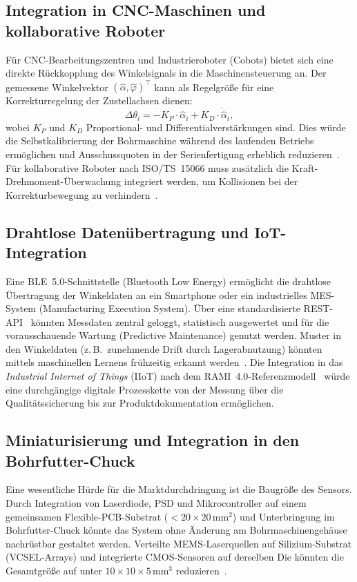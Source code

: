 ﻿\documentclass[a4paper,12pt]{article}
\theoremstyle{definition}
\begin{document}
\subsection{Integration in CNC-Maschinen und kollaborative Roboter}

Für CNC-Bearbeitungszentren und Industrieroboter (Cobots) bietet sich eine
direkte Rückkopplung des Winkelsignals in die Maschinensteuerung an.
Der gemessene Winkelvektor $(\hat{\alpha}, \hat{\varphi})^\top$ kann als
Regelgröße für eine Korrekturregelung der Zustellachsen dienen:
\[
  \Delta\theta_i = -K_P \cdot \hat{\alpha}_i + K_D \cdot \dot{\hat{\alpha}}_i,
\]
wobei $K_P$ und $K_D$ Proportional- und Differentialverstärkungen sind.
Dies würde die Selbstkalibrierung der Bohrmaschine während des laufenden
Betriebs ermöglichen und Ausschussquoten in der Serienfertigung erheblich
reduzieren~\cite{ramesh2000error}.
Für kollaborative Roboter nach ISO/TS~15066 muss zusätzlich die
Kraft-Drehmoment-Überwachung integriert werden, um Kollisionen bei der
Korrekturbewegung zu verhindern~\cite{iso15066}.

\subsection{Drahtlose Datenübertragung und IoT-Integration}

Eine BLE~5.0-Schnittstelle (Bluetooth Low Energy) ermöglicht die drahtlose
Übertragung der Winkeldaten an ein Smartphone oder ein industrielles
MES-System (Manufacturing Execution System).
Über eine standardisierte REST-API~\cite{fielding2000architectural} könnten
Messdaten zentral geloggt, statistisch ausgewertet und für die vorausschauende
Wartung (Predictive Maintenance) genutzt werden.
Muster in den Winkeldaten (z.\,B.\ zunehmende Drift durch Lagerabnutzung)
könnten mittels maschinellen Lernens frühzeitig erkannt werden~\cite{mobley2002maintenance}.
Die Integration in das \textit{Industrial Internet of Things} (IIoT) nach dem
RAMI~4.0-Referenzmodell~\cite{rami2015} würde eine durchgängige digitale
Prozesskette von der Messung über die Qualitätssicherung bis zur
Produktdokumentation ermöglichen.

\subsection{Miniaturisierung und Integration in den Bohrfutter-Chuck}

Eine wesentliche Hürde für die Marktdurchdringung ist die Baugröße des Sensors.
Durch Integration von Laserdiode, PSD und Mikrocontroller auf einem gemeinsamen
Flexible-PCB-Substrat ($< 20 \times 20\,\mathrm{mm}^2$) und Unterbringung im
Bohrfutter-Chuck könnte das System ohne Änderung am Bohrmaschinengehäuse
nachrüstbar gestaltet werden.
Verteilte MEMS-Laserquellen auf Silizium-Substrat (VCSEL-Arrays) und
integrierte CMOS-Sensoren auf derselben Die könnten die Gesamtgröße
auf unter $10 \times 10 \times 5\,\mathrm{mm}^3$ reduzieren~\cite{chua2010mems}.
\end{document}
